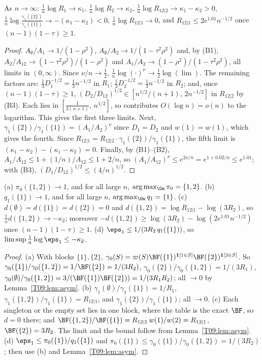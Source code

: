 \documentclass[11pt]{report}
\begin{document}
\begin{T09lemma}\label{T09:lem:asym}
As $n\to\infty$: $\frac1n\log R_1\to\kappa_1$, $\frac1n\log R_2\to\kappa_2$, $\frac1n\log R_{12|2}\to\kappa_1-\kappa_2>0$, $\frac1n\log\frac{\gamma_1(\{2\})}{\gamma_1(\{1\})}\to-(\kappa_1-\kappa_2)<0$, $\frac1n\log R_{12|1}\to0$, and $R_{12|1}\le 2e^{1.01}n^{-1/2}$ once $(n-1)(1-\tau)\ge1$.
\end{T09lemma}
\begin{proof}
$A_\emptyset/A_1\to1/(1-\rho^2)$, $A_\emptyset/A_2\to1/(1-\tau^2\rho^2)$ and, by (B1), $A_2/A_{12}\to(1-\tau^2\rho^2)/(1-\rho^2)$ and $A_1/A_2\to(1-\rho^2)/(1-\tau^2\rho^2)$, all limits in $(0,\infty)$. Since $\nu/n\to\frac12$, $\frac1n\log(\cdot)^\nu\to\frac12\log(\lim)$. The remaining factors are: $\frac13 D_1^{-1/2}=\frac13n^{-1/2}$ in $R_1$; $\frac13D_2^{-1/2}=\frac13n^{-1/2}$ in $R_2$; and, once $(n-1)(1-\tau)\ge1$, $(D_2/D_{12})^{1/2}\in[n^{1/2}/(n+1),\,2n^{-1/2}]$ in $R_{12|2}$ by (B3). Each lies in $[\frac1{3(n+1)},\,n^{1/2}]$, so contributes $O(\log n)=o(n)$ to the logarithm. This gives the first three limits. Next, $\gamma_1(\{2\})/\gamma_1(\{1\})=(A_1/A_2)^\nu$ since $D_1=D_2$ and $w(1)=w(1)$, which gives the fourth. Since $R_{12|1}=R_{12|2}\cdot\gamma_1(\{2\})/\gamma_1(\{1\})$, the fifth limit is $(\kappa_1-\kappa_2)-(\kappa_1-\kappa_2)=0$. Finally, by (B1)--(B2), $A_1/A_{12}\le1+(1/n)/A_{12}\le1+2/n$, so $(A_1/A_{12})^\nu\le e^{2\nu/n}=e^{1+0.02/n}\le e^{1.01}$; with (B3), $(D_1/D_{12})^{1/2}\le(4/n)^{1/2}$.
\end{proof}

\begin{T09lemma}\label{T09:lem:fam}
(a) $\pi_0(\{1,2\})\to1$, and for all large $n$, $\arg\max_\Om\pi_0=\{1,2\}$. (b) $q_1(\{1\})\to1$, and for all large $n$, $\arg\max_\Om q_1=\{1\}$. (c) $d(\emptyset)=d(\{1\})=d(\{2\})=0$ and $d(\{1,2\})=\log R_{12|1}-\log(3R_2)$, so $\frac1n d(\{1,2\})\to-\kappa_2$; moreover $-d(\{1,2\})\ge\log(3R_2)-\log(2e^{1.01}n^{-1/2})$ once $(n-1)(1-\tau)\ge1$. (d) $\eps_1\le 1/(3R_2\,q_1(\{1\}))$, so $\limsup\frac1n\log\eps_1\le-\kappa_2$.
\end{T09lemma}
\begin{proof}
(a) With blocks $\{1\},\{2\}$, $\gamma_0(S)=\varpi(S)\BF(\{1\})^{\mathbf 1[1\in S]}\BF(\{2\})^{\mathbf 1[2\in S]}$. So $\gamma_0(\{1\})/\gamma_0(\{1,2\})=1/\BF(\{2\})=1/(3R_2)$, $\gamma_0(\{2\})/\gamma_0(\{1,2\})=1/(3R_1)$, $\gamma_0(\emptyset)/\gamma_0(\{1,2\})=3/(\BF(\{1\})\BF(\{2\}))=1/(3R_1R_2)$; all $\to0$ by Lemma~\ref{T09:lem:asym}. (b) $\gamma_1(\emptyset)/\gamma_1(\{1\})=1/R_1$, $\gamma_1(\{1,2\})/\gamma_1(\{1\})=R_{12|1}$, and $\gamma_1(\{2\})/\gamma_1(\{1\})$; all $\to0$. (c) Each singleton or the empty set lies in one block, where the table is the exact $\BF$, so $d=0$ there; and $\BF(\{1,2\})/\BF(\{1\})=R_{12|1}\,w(1)/w(2)=R_{12|1}$, $\BF(\{2\})=3R_2$. The limit and the bound follow from Lemma~\ref{T09:lem:asym}. (d) $\eps_1\le\pi_0(\{1\})/q_1(\{1\})$ and $\pi_0(\{1\})\le\gamma_0(\{1\})/\gamma_0(\{1,2\})=1/(3R_2)$; then use (b) and Lemma~\ref{T09:lem:asym}.
\end{proof}
\end{document}
